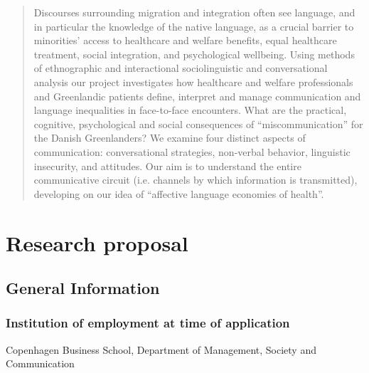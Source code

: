 \documentclass[twocolumn, issue, rga, authordate]{jote-new-article}
\author[1]{Daria Schwalbe}
\affil[1]{University of Southern Denmark, SDU · Department of Language and Communication}
\begin{document}
    \begin{frontmatter}
    \maketitle
    \begin{abstract}

Discourses surrounding migration and integration often see language, and in particular the knowledge of the native language, as a crucial barrier to minorities' access to healthcare and welfare benefits, equal healthcare treatment, social integration, and psychological wellbeing.
Using methods of ethnographic and interactional sociolinguistic and conversational analysis our project investigates how healthcare and welfare professionals and Greenlandic patients define, interpret and manage communication and language inequalities in face-to-face encounters. What are the practical, cognitive, psychological and social consequences of ``miscommunication'' for the Danish Greenlanders? We examine four distinct aspects of communication: conversational strategies, non-verbal behavior, linguistic insecurity, and attitudes.
Our aim is to understand the entire communicative circuit (i.e. channels by which information is transmitted), developing on our idea of
``affective language economies of health''.
    \end{abstract}
    \end{frontmatter}




\section{Research proposal}



\subsection{General Information}



\subsubsection{Institution of employment at time of application}


Copenhagen Business School, Department of Management, Society and Communication
\end{document}
